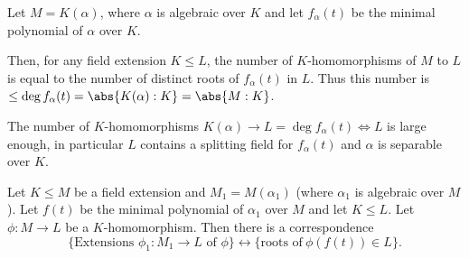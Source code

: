 \documentclass{article}
\begin{document}
\begin{nlemma}\label{lem:2.6}
    Let $M = K(\alpha)$, where $\alpha$ is algebraic over $K$ and let $f_\alpha(t)$ be the minimal polynomial of $\alpha$ over $K$.

    Then, for any field extension $K \leq L$, the number of $K$-homomorphisms of $M$ to $L$ is equal to the number of distinct roots of $f_\alpha(t)$ in $L$.
    Thus this number is $\leq \deg f_\alpha(t) = \abs{K(\alpha):K} = \abs{M:K}$.

    \begin{center}
    \end{center}
\end{nlemma}



\begin{ncor}\label{cor:2.7}
    The number of $K$-homomorphisms $K(\alpha) \to L = \deg f_\alpha(t) \iff L$ is large enough, in particular $L$ contains a splitting field for $f_\alpha(t)$ and $\alpha$ is separable over $K$.
\end{ncor}

\begin{nlemma}\label{lem:2.8}
    Let $K \leq M$ be a field extension and $M_1 = M(\alpha_1)$ (where $\alpha_1$ is algebraic over $M$).
    Let $f(t)$ be the minimal polynomial of $\alpha_1$ over $M$ and let $K \leq L$.
    Let $\phi: M \to L$ be a $K$-homomorphism. Then there is a correspondence
    \begin{equation*}
        \{\text{Extensions } \phi_1:M_1 \to L \text{ of } \phi\} \longleftrightarrow \{\text{roots of} \ \phi(f(t)) \in L\}.
    \end{equation*}
    \begin{center}
    \end{center}
\end{nlemma}
\end{document}
